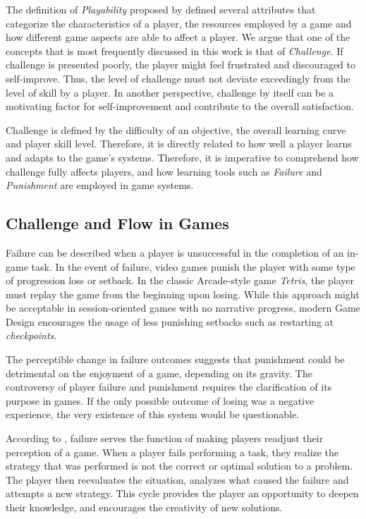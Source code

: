 The definition of \emph{Playability} proposed by \citet{ARTICLE_FromUsabilityToPlayability} defined several attributes that categorize the characteristics of a player, the resources employed by a game and how different game aspects are able to affect a player. We argue that one of the concepts that is most frequently discussed in this work is that of  \emph{Challenge}. If challenge is presented poorly, the player might feel frustrated and discouraged to self-improve. Thus, the level of challenge must not deviate exceedingly from the level of skill by a player. In another perspective, challenge by itself can be a motivating factor for self-improvement and contribute to the overall satisfaction.  

Challenge is defined by the difficulty of an objective, the overall learning curve and player skill level. Therefore, it is directly related to how well a player learns and adapts to the game's systems. Therefore, it is imperative to comprehend how challenge fully affects players, and how learning tools such as \emph{Failure} and \emph{Punishment} are employed in game systems.

\subsection{Challenge and Flow in Games}
\label{sec:challenge-flow}

Failure can be described when a player is unsuccessful in the completion of an in-game task. In the event of failure, video games punish the player with some type of progression loss or setback. In the classic Arcade-style game \emph{Tetris}, the player must replay the game from the beginning upon losing. While this approach might be acceptable in session-oriented games with no narrative progress, modern Game Design encourages the usage of less punishing setbacks such as restarting at \emph{checkpoints}.

The perceptible change in failure outcomes suggests that punishment could be detrimental on the enjoyment of a game, depending on its gravity. The controversy of player failure and punishment requires the clarification of its purpose in games. If the only possible outcome of losing was a negative experience, the very existence of this system would be questionable.

According to \citet{ARTICLE_FearOfFailure}, failure serves the function of making players readjust their perception of a game. When a player fails performing a task, they realize the strategy that was performed is not the correct or optimal solution to a problem. The player then reevaluates the situation, analyzes what caused the failure and attempts a new strategy. This cycle provides the player an opportunity to deepen their knowledge, and encourages the creativity of new solutions.

